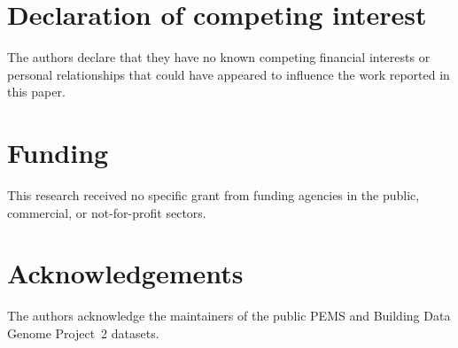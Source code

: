 \documentclass[final,5p,times,twocolumn,numbers]{elsarticle}
\begin{document}
\section*{Declaration of competing interest}
The authors declare that they have no known competing financial interests or personal relationships that could have appeared to influence the work reported in this paper.
\section*{Funding}
This research received no specific grant from funding agencies in the public, commercial, or not-for-profit sectors.
\section*{Acknowledgements}
The authors acknowledge the maintainers of the public PEMS and Building Data Genome Project~2 datasets.


\end{document}
